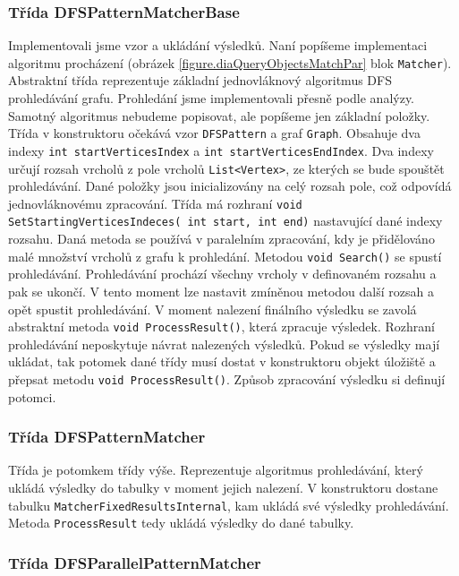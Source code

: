 \subsubsection{Třída DFSPatternMatcherBase}

Implementovali jsme vzor a ukládání výsledků.
Naní popíšeme implementaci algoritmu procházení (obrázek \ref{figure.diaQueryObjectsMatchPar} blok \texttt{Matcher}).
Abstraktní třída reprezentuje základní jednovláknový algoritmus DFS prohledávání grafu.
Prohledání jsme implementovali přesně podle analýzy.
Samotný algoritmus nebudeme popisovat, ale popíšeme jen základní položky.
Třída v konstruktoru očekává vzor \texttt{DFSPattern} a graf \texttt{Graph}.
Obsahuje dva indexy \texttt{int startVerticesIndex} a \texttt{int startVerticesEndIndex}.
Dva indexy určují rozsah vrcholů z pole vrcholů \texttt{List<Vertex>}, ze kterých se bude spouštět prohledávání.
Dané položky jsou inicializovány na celý rozsah pole, což odpovídá jednovláknovému zpracování.
Třída má rozhraní \texttt{void SetStartingVerticesIndeces( int start, int end)} nastavující dané indexy rozsahu.
Daná metoda se používá v paralelním zpracování, kdy je přidělováno malé množství vrcholů z grafu k prohledání.
Metodou \texttt{void Search()} se spustí prohledávání.
Prohledávání prochází všechny vrcholy v definovaném rozsahu a pak se ukončí.
V tento moment lze nastavit zmíněnou metodou další rozsah a opět spustit prohledávání.
V moment nalezení finálního výsledku se zavolá abstraktní metoda \texttt{void ProcessResult()}, která zpracuje výsledek.
Rozhraní prohledávání neposkytuje návrat nalezených výsledků.
Pokud se výsledky mají ukládat, tak potomek dané třídy musí dostat v konstruktoru objekt úložiště a přepsat metodu \texttt{void ProcessResult()}.
Způsob zpracování výsledku si definují potomci.

\subsubsection{Třída DFSPatternMatcher}

Třída je potomkem třídy výše.
Reprezentuje algoritmus prohledávání, který ukládá výsledky do tabulky v moment jejich nalezení.
V konstruktoru dostane tabulku \texttt{MatcherFixedResultsInternal}, kam ukládá své výsledky prohledávání.
Metoda \texttt{ProcessResult} tedy ukládá výsledky do dané tabulky.

\subsubsection{Třída DFSParallelPatternMatcher}

